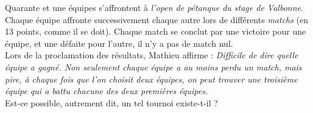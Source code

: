 Quarante et une équipes s'affrontent à \emph{l'open de pétanque du stage de Valbonne}. Chaque équipe affronte successivement chaque autre lors de différents \emph{matchs} (en 13 points, comme il se doit). Chaque match se conclut par une victoire pour une équipe, et une défaite pour l'autre, il n'y a pas de match nul.\\

Lors de la proclamation des résultats, Mathieu affirme : \emph{\og Difficile de dire quelle équipe a gagné. Non seulement chaque équipe a au moins perdu un match, mais pire, à chaque fois que l'on choisit deux équipes, on peut trouver une troisième équipe qui a battu chacune des deux premières équipes. \fg}\\
Est-ce possible, autrement dit, un tel tournoi existe-t-il ?